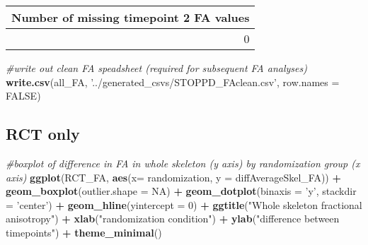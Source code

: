 \documentclass[]{article}
\newenvironment{Shaded}{\begin{snugshade}}{\end{snugshade}}
\newcommand{\KeywordTok}[1]{\textcolor[rgb]{0.13,0.29,0.53}{\textbf{#1}}}
\newcommand{\DataTypeTok}[1]{\textcolor[rgb]{0.13,0.29,0.53}{#1}}
\newcommand{\DecValTok}[1]{\textcolor[rgb]{0.00,0.00,0.81}{#1}}
\newcommand{\StringTok}[1]{\textcolor[rgb]{0.31,0.60,0.02}{#1}}
\newcommand{\CommentTok}[1]{\textcolor[rgb]{0.56,0.35,0.01}{\textit{#1}}}
\newcommand{\OtherTok}[1]{\textcolor[rgb]{0.56,0.35,0.01}{#1}}
\newcommand{\OperatorTok}[1]{\textcolor[rgb]{0.81,0.36,0.00}{\textbf{#1}}}
\newcommand{\NormalTok}[1]{#1}
\theoremstyle{definition}
\theoremstyle{definition}
\theoremstyle{definition}
\theoremstyle{remark}
\begin{document}
\begin{Shaded}
\end{Shaded}

\begin{tabular}{r}
\hline
Number of missing timepoint 2 FA values\\
\hline
0\\
\hline
\end{tabular}

\begin{Shaded}
\begin{Highlighting}[]
\CommentTok{#write out clean FA speadsheet (required for subsequent FA analyses)}
\KeywordTok{write.csv}\NormalTok{(all_FA, }\StringTok{'../generated_csvs/STOPPD_FAclean.csv'}\NormalTok{, }\DataTypeTok{row.names =} \OtherTok{FALSE}\NormalTok{)}
\end{Highlighting}
\end{Shaded}

\subsection{RCT only}\label{rct-only-2}

\begin{Shaded}
\begin{Highlighting}[]
\CommentTok{#boxplot of difference in FA in whole skeleton (y axis) by randomization group (x axis)}
\KeywordTok{ggplot}\NormalTok{(RCT_FA, }\KeywordTok{aes}\NormalTok{(}\DataTypeTok{x=}\NormalTok{ randomization, }\DataTypeTok{y =}\NormalTok{ diffAverageSkel_FA)) }\OperatorTok{+}\StringTok{ }
\StringTok{   }\KeywordTok{geom_boxplot}\NormalTok{(}\DataTypeTok{outlier.shape =} \OtherTok{NA}\NormalTok{) }\OperatorTok{+}\StringTok{ }
\StringTok{   }\KeywordTok{geom_dotplot}\NormalTok{(}\DataTypeTok{binaxis =} \StringTok{'y'}\NormalTok{, }\DataTypeTok{stackdir =} \StringTok{'center'}\NormalTok{) }\OperatorTok{+}
\StringTok{   }\KeywordTok{geom_hline}\NormalTok{(}\DataTypeTok{yintercept =} \DecValTok{0}\NormalTok{) }\OperatorTok{+}
\StringTok{   }\KeywordTok{ggtitle}\NormalTok{(}\StringTok{"Whole skeleton fractional anisotropy"}\NormalTok{) }\OperatorTok{+}
\StringTok{   }\KeywordTok{xlab}\NormalTok{(}\StringTok{"randomization condition"}\NormalTok{) }\OperatorTok{+}\StringTok{  }
\StringTok{   }\KeywordTok{ylab}\NormalTok{(}\StringTok{"difference between timepoints"}\NormalTok{) }\OperatorTok{+}
\StringTok{   }\KeywordTok{theme_minimal}\NormalTok{()}
\end{Highlighting}
\end{Shaded}
\end{document}
